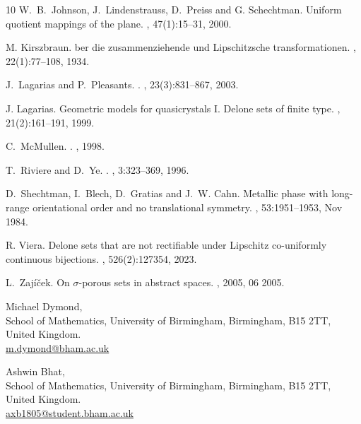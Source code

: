 \documentclass{article}
\begin{document}
\begin{thebibliography}{10}
W.~B.~Johnson, J.~Lindenstrauss, D.~Preiss and G. Schechtman.
\newblock Uniform quotient mappings of the plane.
, 47(1):15--31, 2000.

M. Kirszbraun.
ber die zusammenziehende und {L}ipschitzsche transformationen.
, 22(1):77--108, 1934.

J.~Lagarias and P.~Pleasants.
.
, 23(3):831--867, 2003.

J. Lagarias.
\newblock Geometric models for quasicrystals I. Delone sets of finite type.
, 21(2):161--191, 1999.

C.~McMullen.
.
, 1998.

T.~Riviere and D.~Ye.
.
, 3:323--369, 1996.

D.~Shechtman, I.~Blech, D.~Gratias and J.~W. Cahn.
\newblock Metallic phase with long-range orientational order and no translational symmetry.
, 53:1951--1953, Nov 1984.

R. Viera.
\newblock Delone sets that are not rectifiable under {L}ipschitz co-uniformly continuous bijections.
, 526(2):127354, 2023.

L.~Zajíček.
\newblock On $\sigma$-porous sets in abstract spaces.
, 2005, 06 2005.

\end{thebibliography}

\begin{flushleft}
    Michael Dymond,\\
    School of Mathematics, University of Birmingham, Birmingham, B15 2TT, United Kingdom.\\
    \href{mailto:m.dymond@bham.ac.uk}{m.dymond@bham.ac.uk} 
\end{flushleft}

\begin{flushleft}
    Ashwin Bhat,\\
    School of Mathematics, University of Birmingham, Birmingham, B15 2TT, United Kingdom.\\
    \href{mailto:axb1805@student.bham.ac.uk}{axb1805@student.bham.ac.uk} 
\end{flushleft}
\end{document}
